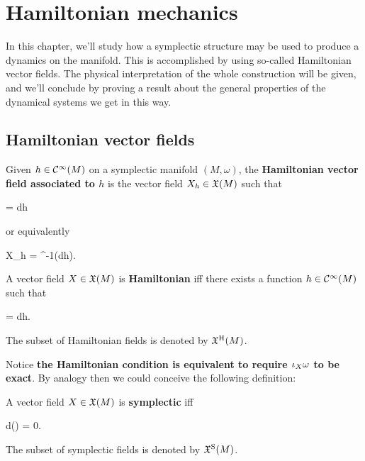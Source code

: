 \documentclass[main.tex]{subfiles}
\begin{document}
\chapter{Hamiltonian mechanics}
In this chapter, we'll study how a symplectic structure may be used to produce a dynamics on the manifold. This is accomplished by using so-called Hamiltonian vector fields. The physical interpretation of the whole construction will be given, and we'll conclude by proving a result about the general properties of the dynamical systems we get in this way.

\section{Hamiltonian vector fields}
\begin{definition}
	Given $h \in \mathcal{C}^\infty(M)$ on a symplectic manifold $(M, \omega)$, the \textbf{Hamiltonian vector field associated to $h$} is the vector field $X_h \in \mathfrak{X}(M)$ such that
	\begin{eqalign}
		 \omega = dh
	\end{eqalign}
	or equivalently\footnotemark
	\begin{eqalign}
		X_h = \omega^{-1}(dh).
	\end{eqalign}
\end{definition}

\begin{definition}
	A vector field $X \in \mathfrak{X}(M)$ is \textbf{Hamiltonian} iff there exists a function $h \in \mathcal{C}^\infty(M)$ such that
	\begin{eqalign}
		 \omega = dh.
	\end{eqalign}
	The subset of Hamiltonian fields is denoted by $\mathfrak{X}^{\mathrm{H}}(M)$.
\end{definition}

Notice \textbf{the Hamiltonian condition is equivalent to require $\iota_{X}\omega$ to be exact}. By analogy then we could conceive the following definition:

\begin{definition}
	A vector field $X \in \mathfrak{X}(M)$ is \textbf{symplectic} iff
	\begin{eqalign}
		d(\omega) = 0.
	\end{eqalign}
	The subset of symplectic fields is denoted by $\mathfrak{X}^{\mathrm{S}}(M)$.
\end{definition}
\end{document}
